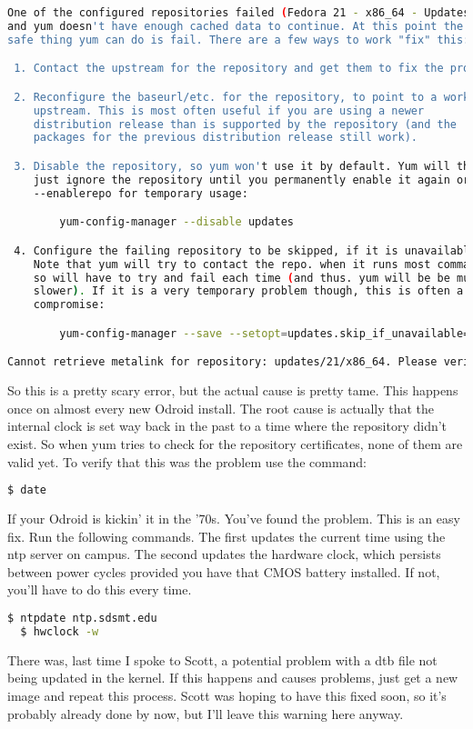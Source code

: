 \begin{lstlisting}[language=bash]
  One of the configured repositories failed (Fedora 21 - x86_64 - Updates),
and yum doesn't have enough cached data to continue. At this point the only
safe thing yum can do is fail. There are a few ways to work "fix" this:

 1. Contact the upstream for the repository and get them to fix the problem.

 2. Reconfigure the baseurl/etc. for the repository, to point to a working
    upstream. This is most often useful if you are using a newer
    distribution release than is supported by the repository (and the
    packages for the previous distribution release still work).

 3. Disable the repository, so yum won't use it by default. Yum will then
    just ignore the repository until you permanently enable it again or use
    --enablerepo for temporary usage:

        yum-config-manager --disable updates

 4. Configure the failing repository to be skipped, if it is unavailable.
    Note that yum will try to contact the repo. when it runs most commands,
    so will have to try and fail each time (and thus. yum will be be much
    slower). If it is a very temporary problem though, this is often a nice
    compromise:

        yum-config-manager --save --setopt=updates.skip_if_unavailable=true

Cannot retrieve metalink for repository: updates/21/x86_64. Please verify its path and try again.	
\end{lstlisting}

So this is a pretty scary error, but the actual cause is pretty tame. This happens once on almost every new Odroid install. The root cause is actually that the internal clock is set way back in the past to a time where the repository didn't exist. So when yum tries to check for the repository certificates, none of them are valid yet. To verify that this was the problem use the command:

\begin{lstlisting}[language=bash]
  $ date
\end{lstlisting}

If your Odroid is kickin' it in the '70s. You've found the problem. This is an easy fix. Run the following commands. The first updates the current time using the ntp server on campus. The second updates the hardware clock, which persists between power cycles provided you have that CMOS battery installed. If not, you'll have to do this every time.

\begin{lstlisting}[language=bash]
  $ ntpdate ntp.sdsmt.edu
  $	hwclock -w
\end{lstlisting}

There was, last time I spoke to Scott, a potential problem with a dtb file not being updated in the kernel. If this happens and causes problems, just get a new image and repeat this process. Scott was hoping to have this fixed soon, so it's probably already done by now, but I'll leave this warning here anyway.